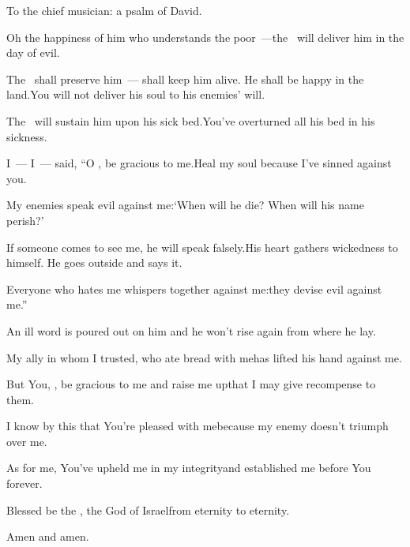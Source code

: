 
\begin{inparaenum}
  \noindent{} To the chief musician: a psalm of David.\smallskip%

  \pa{} Oh the happiness of him who understands the poor~---\pa{}the \lord\ will deliver him in the day of evil.%

  \pa{} The \lord\ shall preserve him~--- shall keep him alive. He shall be happy in the land.\pa{}You will not deliver his soul to his enemies' will.%

  \pa{} The \lord\ will sustain him upon his sick bed.\pa{}You've overturned all his bed in his sickness.%

  \pb{} I~--- I~--- said, ``O \lord, be gracious to me.\pa{}Heal my soul because I've sinned against you.%

  \pa{} My enemies speak evil against me:\pa{}`When will he die? When will his name perish?'%

  \pa{} If someone comes to see me, he will speak falsely.\pa{}His heart gathers wickedness to himself. He goes outside and says it.%

  \pa{} Everyone who hates me whispers together against me:\pa{}they devise evil against me.''%

  \pa{} An ill%
  word is poured out on him%
  and he won't rise again from where he lay.%

  \pa{} My ally in whom I trusted, who ate bread with me\pa{}has lifted his hand against me.%

  \pb{} But You, \lord, be gracious to me and raise me up\pa{}that I may give recompense to them.%

  \pa{} I know by this that You're pleased with me\pa{}because my enemy doesn't triumph over me.%

  \pa{} As for me, You've upheld me in my integrity\pa{}and established me before You forever.%

  \pa{} Blessed be the \lord, the God of Israel\pa{}from eternity to eternity.%

  \hfil Amen and amen.\hfil%
\end{inparaenum}
